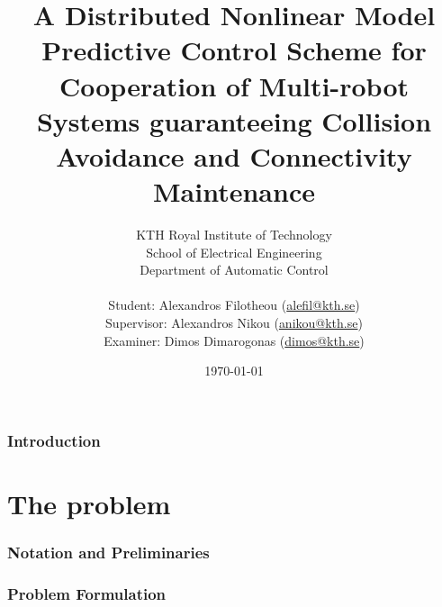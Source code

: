 \documentclass[a4paper,12pt,twoside]{article}
\title{\textbf{A Distributed Nonlinear Model Predictive Control Scheme for
Cooperation of Multi-robot Systems guaranteeing Collision Avoidance and
Connectivity Maintenance}}
\author{KTH Royal Institute of Technology \\
  School of Electrical Engineering \\
  Department of Automatic Control \\ \\
Student: Alexandros Filotheou (\href{mailto: alefil@kth.se}{alefil@kth.se}) \\
Supervisor: Alexandros Nikou (\href{mailto: anikou@kth.se}{anikou@kth.se}) \\
Examiner: Dimos Dimarogonas (\href{mailto: dimos@kth.se}{dimos@kth.se}) \\}
\date{\today}
\begin{document}
\maketitle


\cleardoublepage
\tableofcontents
\cleardoublepage


\section{Introduction}

  
  \cleardoublepage

\part{The problem}
\cleardoublepage

  \section{Notation and Preliminaries}
    \label{sec:notation_reliminaries}

    
    
    
    \cleardoublepage


  \section{Problem Formulation}
    \label{sec:prob_formulation}
\end{document}
